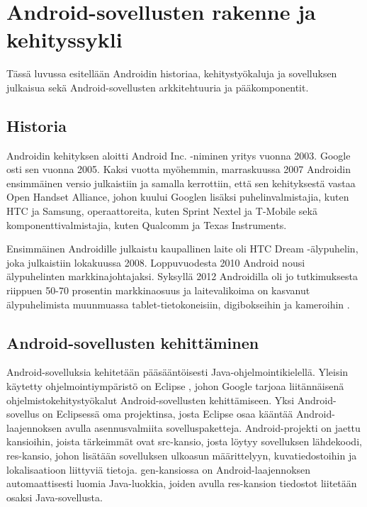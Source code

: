 \section{Android-sovellusten rakenne ja kehityssykli}

Tässä luvussa esitellään Androidin historiaa, kehitystyökaluja ja sovelluksen julkaisua sekä Android-sovellusten arkkitehtuuria ja pääkomponentit.

\subsection{Historia}

Androidin kehityksen aloitti Android Inc. -niminen yritys vuonna 2003. Google osti sen vuonna 2005. Kaksi vuotta myöhemmin, marraskuussa 2007 Androidin ensimmäinen versio julkaistiin ja samalla kerrottiin, että sen kehityksestä vastaa Open Handset Alliance, johon kuului Googlen lisäksi puhelinvalmistajia, kuten HTC ja Samsung, operaattoreita, kuten Sprint Nextel ja T-Mobile sekä komponenttivalmistajia, kuten Qualcomm ja Texas Instruments.

Ensimmäinen Androidille julkaistu kaupallinen laite oli HTC Dream -älypuhelin, joka julkaistiin lokakuussa 2008. Loppuvuodesta 2010 Android nousi älypuhelinten markkinajohtajaksi. Syksyllä 2012 Androidilla oli jo tutkimuksesta riippuen 50-70 prosentin markkinaosuus ja laitevalikoima on kasvanut älypuhelimista muunmuassa tablet-tietokoneisiin, digibokseihin ja kameroihin \cite{wikiandroid}.

\subsection{Android-sovellusten kehittäminen}
\label{tools}

Android-sovelluksia kehitetään pääsääntöisesti Java-ohjelmointikielellä. Yleisin käytetty ohjelmointiympäristö on Eclipse \cite{eclipse}, johon Google tarjoaa liitännäisenä ohjelmistokehitystyökalut Android-sovellusten kehittämiseen. Yksi Android-sovellus on Eclipsessä oma projektinsa, josta Eclipse osaa kääntää Android-laajennoksen avulla asennusvalmiita sovelluspaketteja. Android-projekti on jaettu kansioihin, joista tärkeimmät ovat src-kansio, josta löytyy sovelluksen lähdekoodi, res-kansio, johon lisätään sovelluksen ulkoasun määrittelyyn, kuvatiedostoihin ja lokalisaatioon liittyviä tietoja. gen-kansiossa on Android-laajennoksen automaattisesti luomia Java-luokkia, joiden avulla res-kansion tiedostot liitetään osaksi Java-sovellusta.

